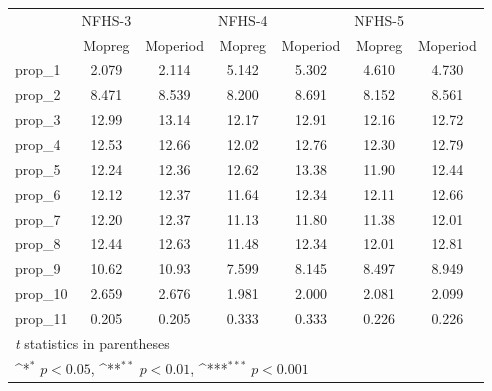 {
\def\sym#1{\ifmmode^{#1}\else\(^{#1}\)\fi}
\begin{tabular}{l*{6}{c}}
\toprule
            &      NFHS-3         &                     &      NFHS-4         &                     &      NFHS-5         &                     \\
            &\multicolumn{1}{c}{Mopreg}&\multicolumn{1}{c}{Moperiod}&\multicolumn{1}{c}{Mopreg}&\multicolumn{1}{c}{Moperiod}&\multicolumn{1}{c}{Mopreg}&\multicolumn{1}{c}{Moperiod}\\
\midrule
\midrule
prop\_1      &       2.079         &       2.114         &       5.142         &       5.302         &       4.610         &       4.730         \\
prop\_2      &       8.471         &       8.539         &       8.200         &       8.691         &       8.152         &       8.561         \\
prop\_3      &       12.99         &       13.14         &       12.17         &       12.91         &       12.16         &       12.72         \\
prop\_4      &       12.53         &       12.66         &       12.02         &       12.76         &       12.30         &       12.79         \\
prop\_5      &       12.24         &       12.36         &       12.62         &       13.38         &       11.90         &       12.44         \\
prop\_6      &       12.12         &       12.37         &       11.64         &       12.34         &       12.11         &       12.66         \\
prop\_7      &       12.20         &       12.37         &       11.13         &       11.80         &       11.38         &       12.01         \\
prop\_8      &       12.44         &       12.63         &       11.48         &       12.34         &       12.01         &       12.81         \\
prop\_9      &       10.62         &       10.93         &       7.599         &       8.145         &       8.497         &       8.949         \\
prop\_10     &       2.659         &       2.676         &       1.981         &       2.000         &       2.081         &       2.099         \\
prop\_11     &       0.205         &       0.205         &       0.333         &       0.333         &       0.226         &       0.226         \\
\bottomrule
\multicolumn{7}{l}{\footnotesize \textit{t} statistics in parentheses}\\
\multicolumn{7}{l}{\footnotesize \sym{*} \(p<0.05\), \sym{**} \(p<0.01\), \sym{***} \(p<0.001\)}\\
\end{tabular}
}
